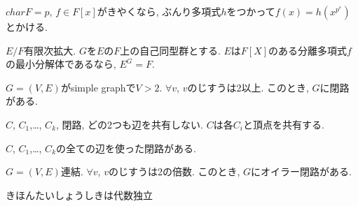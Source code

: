 \begin{prop}
  $char F=p$, $f\in F[x]$がきやくなら,
  ぶんり多項式$h$をつかって$f(x)=h(x^{p^e})$とかける.
\end{prop}

\begin{prop}
  $E/F$有限次拡大.
  $G$を$E$の$F$上の自己同型群とする.
  $E$は$F[X]$のある分離多項式$f$の最小分解体であるなら,
  $E^G=F$.
\end{prop}



\begin{prop}
  $G=(V,E)$がsimple graphで$V>2$.
  $\forall v$, $v$のじすうは2以上.
  このとき, $G$に閉路がある.
\end{prop}

\begin{prop}
  $C$, $C_1$,\ldots, $C_k$, 閉路, どの2つも辺を共有しない.
  $C$は各$C_i$と頂点を共有する.

  $C$, $C_1$,\ldots, $C_k$の全ての辺を使った閉路がある.
\end{prop}


\begin{prop}
  $G=(V,E)$連結.
  $\forall v$, $v$のじすうは2の倍数.
  このとき, $G$にオイラー閉路がある.
\end{prop}



\begin{prop}
きほんたいしょうしきは代数独立
\end{prop}
